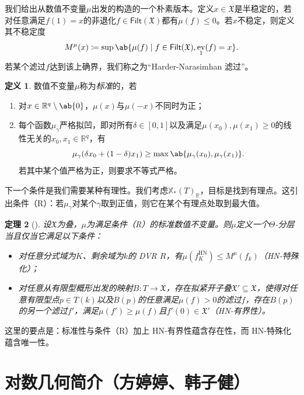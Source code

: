 \documentclass{amsart}
\newtheorem{thm}{定理}[section]
\theoremstyle{definition}
\newtheorem{defn}[thm]{定义}
\theoremstyle{remark}
\theoremstyle{plain}
\theoremstyle{definition}
\theoremstyle{remark}
\newcommand{\R}{\mathbb{R}}
\newcommand{\mf}[1]{\mathfrak{#1}}
\newcommand{\mr}[1]{\mathrm{#1}}
\newcommand{\ms}[1]{\mathsf{#1}}
\newcommand{\1}{\mathbf{1}}
\newcommand{\2}{\mathbf{2}}
\newcommand{\3}{\mathbf{3}}
\DeclareMathOperator{\ev}{ev}
\begin{document}
我们给出从数值不变量\(\mu\)出发的构造的一个朴素版本。定义\(x \in \mf{X}\)是半稳定的，若对任意满足\(f(1) = x\)的非退化\(f \in \ms{Filt}(\mf{X})\)都有\(\mu(f) \leq 0\)。若\(x\)不稳定，则定义其不稳定度
\[ M^{\mu}(x) \coloneqq \sup \ab\{ \mu(f) \mid f \in \ms{Filt}(\mf{X}), \ev_1(f) = x\}. \]
若某个滤过\(f\)达到该上确界，我们称之为“Harder-Narasimhan 滤过”。

\begin{defn}
    数值不变量\(\mu\)称为\textit{标准}的，若
    \begin{enumerate}
        \item 对\(x \in \R^q \setminus \ab\{0\}\)，\(\mu(x)\)与\(\mu(-x)\)不同时为正；
        \item 每个函数\(\mu_{\gamma}\)严格拟凹，即对所有\(\delta \in [0,1]\)以及满足\(\mu(x_0), \mu(x_1) \geq 0\)的线性无关的\(x_0, x_1 \in \R^q\)，有
            \[\mu_{\gamma}(\delta x_0 + (1-\delta)x_1) \geq \max\ab\{\mu_{\gamma}(x_0), \mu_{\gamma}(x_1)\}.\] 若其中某个值严格为正，则要求不等式严格。
    \end{enumerate}
\end{defn}

下一个条件是我们需要某种有理性。我们考虑\(\mathbb{X}_*(T)_{\R}\)，目标是找到有理点。这引出条件（R）：若\(\mu_{\gamma}\)对某个\(\gamma\)取到正值，则它在某个有理点处取到最大值。

\begin{thm}[{\cite{HLinstability}}]
    设\(\mf{X}\)为叠，\(\mu\)为满足条件（R）的标准数值不变量。则\(\mu\)定义一个\(\Theta\)-分层当且仅当它满足以下条件：
    \begin{itemize}
        \item 对任意分式域为\(K\)、剩余域为\(k\)的 DVR \(R\)，有\(\mu(f_K^{\mr{HN}}) \leq M^{\mu}(f_k)\)（HN-特殊化）；
        \item 对任意从有限型概形出发的映射\(B \colon T \to \mf{X}\)，存在拟紧开子叠\(\mf{X}' \subseteq \mf{X}\)，使得对任意有限型点\(p \in T(k)\)以及\(B(p)\)的任意满足\(\mu(f) > 0\)的滤过\(f\)，存在\(B(p)\)的另一个滤过\(f'\)，满足\(\mu(f') \geq \mu(f)\)且\(f'(0) \in \mf{X}'\)（HN-有界性）。
    \end{itemize}
\end{thm}

这里的要点是：标准性与条件（R）加上 HN-有界性蕴含存在性，而 HN-特殊化蕴含唯一性。



\section{对数几何简介（方婷婷、韩子健）}%
\label{sec:Intro to log geometry (Tingting Fang and Zijian Han)}
\end{document}
